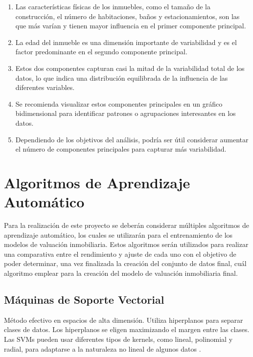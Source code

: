 \begin{enumerate}
    \item Las características físicas de los inmuebles, como el tamaño de la construcción, el número de habitaciones, baños y estacionamientos, son las que más varían y tienen mayor influencia en el primer componente principal.
    \item La edad del inmueble es una dimensión importante de variabilidad y es el factor predominante en el segundo componente principal.
    \item Estos dos componentes capturan casi la mitad de la variabilidad total de los datos, lo que indica una distribución equilibrada de la influencia de las diferentes variables.
    \item Se recomienda visualizar estos componentes principales en un gráfico bidimensional para identificar patrones o agrupaciones interesantes en los datos.
    \item Dependiendo de los objetivos del análisis, podría ser útil considerar aumentar el número de componentes principales para capturar más variabilidad.
\end{enumerate}

\section{Algoritmos de Aprendizaje Automático}

Para la realización de este proyecto se deberán considerar múltiples algoritmos
de aprendizaje automático, los cuales se utilizarán para el entrenamiento de los
modelos de valuación inmobiliaria. Estos algoritmos serán utilizados para realizar
una comparativa entre el rendimiento y ajuste de cada uno con el objetivo de
poder determinar, una vez finalizada la creación del conjunto de datos final,
cuál algoritmo emplear para la creación del modelo de valuación inmobiliaria final.

\subsection{Máquinas de Soporte Vectorial}

Método efectivo en espacios de alta dimensión. Utiliza hiperplanos para separar
clases de datos. Los hiperplanos se eligen maximizando el margen entre las clases.
Las SVMs pueden usar diferentes tipos de kernels, como lineal, polinomial y
radial, para adaptarse a la naturaleza no lineal de algunos datos \cite{10.1145/1143844.1143865}.

